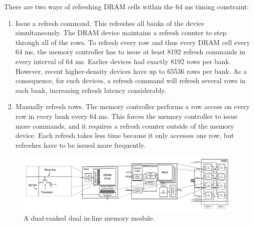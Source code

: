 There are two ways of refreshing DRAM cells within the 64 ms timing constraint:
\begin{enumerate}
  \item Issue a refresh command.
    This  refreshes all banks of the device simultaneously. The DRAM device maintains a refresh counter to step through all of the rows. To refresh every row and thus every DRAM cell every 64 ms, the memory controller has to issue at least 8192 refresh commands in every interval of 64 ms. Earlier devices had exactly 8192 rows per bank. However, recent higher-density devices have up to 65536 rows per bank. As a consequence, for such devices, a refresh command will refresh several rows in each bank, increasing refresh latency considerably.
  \item Manually refresh rows. The memory controller performs a row access on every row in every bank every 64 ms. This forces the memory controller to issue more commands, and it requires a refresh counter outside of the memory device.
Each refresh takes less time because it only accesses one row, but refreshes have to be issued more frequently.
\end{enumerate} 

\begin{figure}[ht]
\begin{center}
\includegraphics[width=\textwidth]{figs/dram-overview.pdf}
\vspace{-13mm}
\caption{A dual-ranked dual in-line memory module.}\label{fig:dram_basics}
\vspace{-6mm}
\end{center}
\end{figure} 

